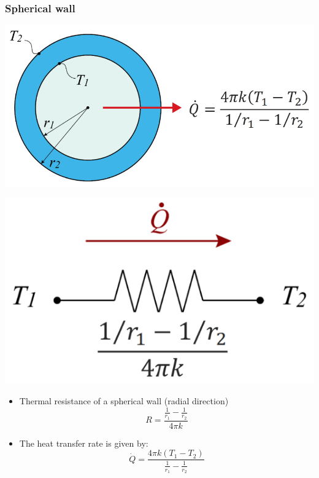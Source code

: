 \documentclass[11pt]{article}
\begin{document}
\subsubsection{Spherical wall}
\label{sec:orgc80603e}
\begin{center}
\includegraphics[scale=1]{./images/thermal-resistance-spherical-wall.png}
\end{center}
\begin{center}
\includegraphics[scale=1]{./images/thermal-resistance-spherical-wall-electrical-analogy.png}
\end{center}
\begin{itemize}
\item Thermal resistance of a spherical wall (radial direction)
\[R = \frac{\frac{1}{r_1} - \frac{1}{r_2}}{4 \pi k}\]
\item The heat transfer rate is given by:
\[\dot{Q} = \frac{4 \pi k (T_1 - T_2)}{\frac{1}{r_1} - \frac{1}{r_2}}\]
\end{itemize}
\end{document}

